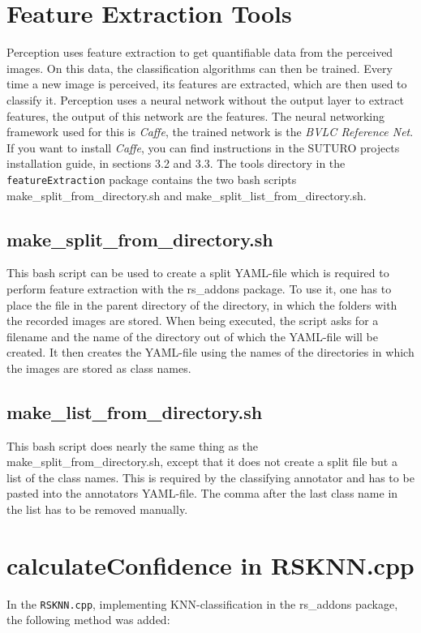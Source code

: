 \documentclass[main.tex]{subfiles}
\begin{document}
\section{Feature Extraction Tools}
Perception uses feature extraction to get quantifiable data from the perceived images. On this data, the classification algorithms can then be trained. Every time a new image is perceived, its features are extracted, which are then used to classify it. Perception uses a neural network without the output layer to extract features, the output of this network are the features. The neural networking framework used for this is \textit{Caffe}, the trained network is the \textit{BVLC Reference Net}. If you want to install \textit{Caffe}, you can find instructions in the SUTURO projects installation guide, in sections 3.2 and 3.3. The tools directory in the \texttt{featureExtraction} package contains the two bash scripts make\_split\_from\_directory.sh and make\_split\_list\_from\_directory.sh.

\subsection{make\_split\_from\_directory.sh} 
This bash script can be used to create a split YAML-file which is required to perform feature extraction with the rs\_addons package. To use it, one has to place the file in the parent directory of the directory, in which the folders with the recorded images are stored. When being executed, the script asks for a filename and the name of the directory out of which the YAML-file will be created. It then creates the YAML-file using the names of the directories in which the images are stored as class names.

\subsection{make\_list\_from\_directory.sh}
This bash script does nearly the same thing as the make\_split\_from\_directory.sh, except that it does not create a split file but a list of the class names. This is required by the classifying annotator and has to be pasted into the annotators YAML-file. The comma after the last class name in the list has to be removed manually.

\section{calculateConfidence in RSKNN.cpp}\label{KNN confidence}
In the \texttt{RSKNN.cpp}, implementing KNN-classification in the rs\_addons package, the following method was added:
\end{document}
